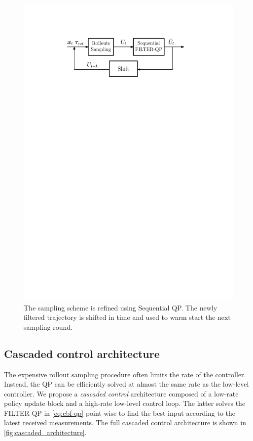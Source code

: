 \begin{figure}[t]
\centering
\includegraphics[width=0.8\columnwidth]{figures/schemes/stochastic_controller.pdf}
\caption{The sampling scheme is refined using Sequential QP. The newly filtered trajectory is shifted in time and used to warm start the next sampling round.} \label{fig:sampling_scheme}
\end{figure}

\subsection{Cascaded control architecture}
The expensive rollout sampling procedure often limits the rate of the controller. Instead, the QP can be efficiently solved at almost the same rate as the low-level controller. We propose a \emph{cascaded control} architecture composed of a low-rate policy update block and a high-rate low-level control loop. The latter solves the FILTER-QP in \eqref{eq:cbf-qp} point-wise to find the best input according to the latest received measurements. The full cascaded control architecture is shown in \fig \ref{fig:cascaded_architecture}.

